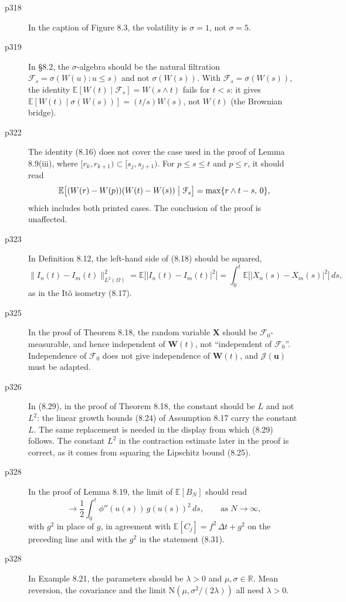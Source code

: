 \documentclass[final]{article}
\theoremstyle{definition}
\newcommand{\vecbs}[1]{\boldsymbol{#1}}
\renewcommand{\vec}[1]{{\vecbs{#1}}}
\begin{document}
\begin{enumerate}
\begin{description}
   \item[p318] In the caption of Figure 8.3, the volatility is $\sigma=1$, not
$\sigma=5$.
   \item[p319] In \S8.2, the $\sigma$-algebra should be the natural
filtration $\mathcal{F}_s=\sigma(W(u)\colon u\le s)$ and not $\sigma(W(s))$.
With $\mathcal{F}_s=\sigma(W(s))$, the identity
$\mathbb{E}[W(t)\mid\mathcal{F}_s]=W(s\wedge t)$ fails for $t<s$: it gives
$\mathbb{E}[W(t)\mid\sigma(W(s))]=(t/s)W(s)$, not $W(t)$ (the Brownian bridge).
   \item[p322] The identity (8.16) does not cover the case used in the proof
of Lemma 8.9(iii), where $[r_k,r_{k+1})\subset[s_j,s_{j+1})$. For
$p\le s\le t$ and $p\le r$, it should read
\[
\mathbb{E}\bigl[(W(r)-W(p))(W(t)-W(s))\bigm|\mathcal{F}_s\bigr]
=\max\{r\wedge t-s,\,0\},
\]
which includes both printed cases. The conclusion of the proof is unaffected.
   \item[p323] In Definition 8.12, the left-hand side of (8.18) should be
squared,
\[
\|I_n(t)-I_m(t)\|_{L^2(\Omega)}^2
=\mathbb{E}\bigl[\lvert I_n(t)-I_m(t)\rvert^2\bigr]
=\int_0^t \mathbb{E}\bigl[\lvert X_n(s)-X_m(s)\rvert^2\bigr]\,ds,
\]
as in the It\^o isometry (8.17).
   \item[p325] In the proof of Theorem 8.18, the random variable $\vec X$ should
be $\mathcal{F}_0$-measurable, and hence independent of $\vec W(t)$, not
``independent of $\mathcal{F}_0$''. Independence of $\mathcal{F}_0$ does not
give independence of $\vec W(t)$, and $\mathcal{J}(\vec u)$ must be adapted.
   \item[p326] In (8.29), in the proof of Theorem 8.18, the constant should be
$L$ and not $L^2$: the linear growth bounds (8.24) of Assumption 8.17 carry the
constant $L$. The same replacement is needed in the display from which (8.29)
follows. The constant $L^2$ in the contraction estimate later in the proof is
correct, as it comes from squaring the Lipschitz bound (8.25).
   \item[p328] In the proof of Lemma 8.19, the limit of
$\mathbb{E}[B_N]$ should read
\[
\to \frac12\int_0^t \phi''(u(s))\,g(u(s))^2\,ds,\qquad\text{as }N\to\infty,
\]
with $g^2$ in place of $g$, in agreement with
$\mathbb{E}[C_j]=f^2\,\Delta t+g^2$ on the preceding line and with the $g^2$ in
the statement (8.31).
   \item[p328] In Example 8.21, the parameters should be $\lambda>0$ and
$\mu,\sigma\in\mathbb{R}$. Mean reversion, the covariance and the limit
$\mathrm{N}(\mu,\sigma^2/(2\lambda))$ all need $\lambda>0$.

\end{description}
\end{enumerate}
\end{document}
